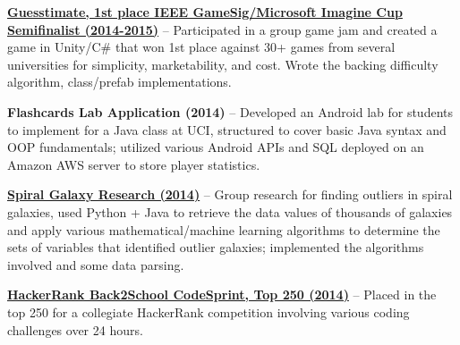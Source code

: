\documentclass[letterpaper,MMMyyyy,nonstopmode]{simpleresumecv}
\begin{document}
\begin{Body}
\Entry
\BulletItem
\href{https://github.com/brendonwai/PAS}
{\textbf{Guesstimate, 1st place IEEE GameSig/Microsoft Imagine Cup Semifinalist (2014-2015)}} -- Participated in a group game jam and created a game in Unity/C\# that won 1st place against 30+ games from several universities for simplicity, marketability, and cost. Wrote the backing difficulty algorithm, class/prefab implementations.\newline

\Entry
\BulletItem
{\textbf{Flashcards Lab Application (2014)}} -- Developed an Android lab for students to implement for a Java class at UCI, structured to cover basic Java syntax and OOP fundamentals; utilized various Android APIs and SQL deployed on an Amazon AWS server to store player statistics.\newline

\Entry
\BulletItem
\href{https://github.com/SVT125/Research-CS199}
{\textbf{Spiral Galaxy Research (2014)}} -- Group research for finding outliers in spiral galaxies, used Python + Java to retrieve the data values of thousands of galaxies and apply various mathematical/machine learning algorithms to determine the sets of variables that identified outlier galaxies; implemented the algorithms involved and some data parsing.\newline

\Entry
\BulletItem
\href{https://www.hackerrank.com/contests/back2school14/challenges}
{\textbf{HackerRank Back2School CodeSprint, Top 250 (2014)}} -- Placed in the top 250 for a collegiate HackerRank competition involving various coding challenges over 24 hours.\newline

\end{Body}
\end{document}

